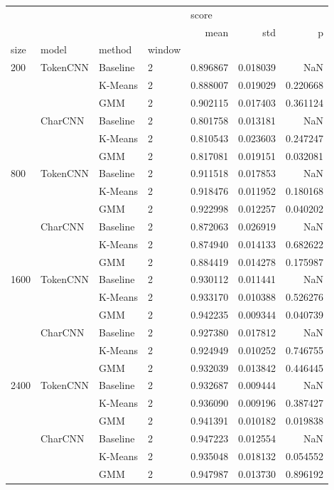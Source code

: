 \begin{tabular}{llllrrr}
\toprule
     &         &     &   & \multicolumn{3}{l}{score} \\
     &         &     &   &      mean &       std &         p \\
size & model & method & window &           &           &           \\
\midrule
200  & TokenCNN & Baseline & 2 &  0.896867 &  0.018039 &       NaN \\
     &         & K-Means & 2 &  0.888007 &  0.019029 &  0.220668 \\
     &         & GMM & 2 &  0.902115 &  0.017403 &  0.361124 \\
     & CharCNN & Baseline & 2 &  0.801758 &  0.013181 &       NaN \\
     &         & K-Means & 2 &  0.810543 &  0.023603 &  0.247247 \\
     &         & GMM & 2 &  0.817081 &  0.019151 &  0.032081 \\
800  & TokenCNN & Baseline & 2 &  0.911518 &  0.017853 &       NaN \\
     &         & K-Means & 2 &  0.918476 &  0.011952 &  0.180168 \\
     &         & GMM & 2 &  0.922998 &  0.012257 &  0.040202 \\
     & CharCNN & Baseline & 2 &  0.872063 &  0.026919 &       NaN \\
     &         & K-Means & 2 &  0.874940 &  0.014133 &  0.682622 \\
     &         & GMM & 2 &  0.884419 &  0.014278 &  0.175987 \\
1600 & TokenCNN & Baseline & 2 &  0.930112 &  0.011441 &       NaN \\
     &         & K-Means & 2 &  0.933170 &  0.010388 &  0.526276 \\
     &         & GMM & 2 &  0.942235 &  0.009344 &  0.040739 \\
     & CharCNN & Baseline & 2 &  0.927380 &  0.017812 &       NaN \\
     &         & K-Means & 2 &  0.924949 &  0.010252 &  0.746755 \\
     &         & GMM & 2 &  0.932039 &  0.013842 &  0.446445 \\
2400 & TokenCNN & Baseline & 2 &  0.932687 &  0.009444 &       NaN \\
     &         & K-Means & 2 &  0.936090 &  0.009196 &  0.387427 \\
     &         & GMM & 2 &  0.941391 &  0.010182 &  0.019838 \\
     & CharCNN & Baseline & 2 &  0.947223 &  0.012554 &       NaN \\
     &         & K-Means & 2 &  0.935048 &  0.018132 &  0.054552 \\
     &         & GMM & 2 &  0.947987 &  0.013730 &  0.896192 \\
\bottomrule
\end{tabular}
